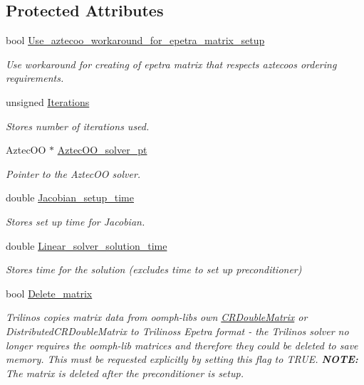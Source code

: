 \subsection*{Protected Attributes}
\begin{DoxyCompactItemize}
\item 
bool \hyperlink{classoomph_1_1TrilinosAztecOOSolver_aead1067bb965649abddcf0af0e2d47f7}{Use\+\_\+aztecoo\+\_\+workaround\+\_\+for\+\_\+epetra\+\_\+matrix\+\_\+setup}
\begin{DoxyCompactList}\small\item\em Use workaround for creating of epetra matrix that respects aztecoo\textquotesingle{}s ordering requirements. \end{DoxyCompactList}\item 
unsigned \hyperlink{classoomph_1_1TrilinosAztecOOSolver_a26a9366d3ec0f11e7e907587c0439ea7}{Iterations}
\begin{DoxyCompactList}\small\item\em Stores number of iterations used. \end{DoxyCompactList}\item 
Aztec\+OO $\ast$ \hyperlink{classoomph_1_1TrilinosAztecOOSolver_ad71b280c5af25e35e0f9da8cd68228cf}{Aztec\+O\+O\+\_\+solver\+\_\+pt}
\begin{DoxyCompactList}\small\item\em Pointer to the Aztec\+OO solver. \end{DoxyCompactList}\item 
double \hyperlink{classoomph_1_1TrilinosAztecOOSolver_afec53c52f4fcab981eb0ed7244d750de}{Jacobian\+\_\+setup\+\_\+time}
\begin{DoxyCompactList}\small\item\em Stores set up time for Jacobian. \end{DoxyCompactList}\item 
double \hyperlink{classoomph_1_1TrilinosAztecOOSolver_ab2373a8cdd5c27d2ac099ad8444dfbb7}{Linear\+\_\+solver\+\_\+solution\+\_\+time}
\begin{DoxyCompactList}\small\item\em Stores time for the solution (excludes time to set up preconditioner) \end{DoxyCompactList}\item 
bool \hyperlink{classoomph_1_1TrilinosAztecOOSolver_a6cd6d4719412c7ebf01bfb6cb4fddfcc}{Delete\+\_\+matrix}
\begin{DoxyCompactList}\small\item\em Trilinos copies matrix data from oomph-\/lib\textquotesingle{}s own \hyperlink{classoomph_1_1CRDoubleMatrix}{C\+R\+Double\+Matrix} or Distributed\+C\+R\+Double\+Matrix to Trilinos\textquotesingle{}s Epetra format -\/ the Trilinos solver no longer requires the oomph-\/lib matrices and therefore they could be deleted to save memory. This must be requested explicitly by setting this flag to T\+R\+UE. {\bfseries N\+O\+TE\+:} The matrix is deleted after the preconditioner is setup. \end{DoxyCompactList}\item 

\end{DoxyCompactItemize}
